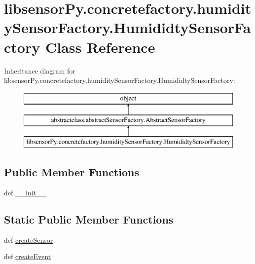 \hypertarget{classlibsensorPy_1_1concretefactory_1_1humiditySensorFactory_1_1HumididtySensorFactory}{}\section{libsensor\+Py.\+concretefactory.\+humidity\+Sensor\+Factory.\+Humididty\+Sensor\+Factory Class Reference}
\label{classlibsensorPy_1_1concretefactory_1_1humiditySensorFactory_1_1HumididtySensorFactory}
Inheritance diagram for libsensor\+Py.\+concretefactory.\+humidity\+Sensor\+Factory.\+Humididty\+Sensor\+Factory\+:\begin{figure}[H]
\begin{center}
\leavevmode
\includegraphics[height=3.000000cm]{classlibsensorPy_1_1concretefactory_1_1humiditySensorFactory_1_1HumididtySensorFactory}
\end{center}
\end{figure}
\subsection*{Public Member Functions}
\begin{DoxyCompactItemize}
\item 
def \hyperlink{classlibsensorPy_1_1concretefactory_1_1humiditySensorFactory_1_1HumididtySensorFactory_ae57b1aa7393268149145eec9984a3ca1}{\+\_\+\+\_\+init\+\_\+\+\_\+}
\end{DoxyCompactItemize}
\subsection*{Static Public Member Functions}
\begin{DoxyCompactItemize}
\item 
def \hyperlink{classlibsensorPy_1_1concretefactory_1_1humiditySensorFactory_1_1HumididtySensorFactory_a74c9d5d974b9d1ddf0825af586bc9e4e}{create\+Sensor}
\item 
def \hyperlink{classlibsensorPy_1_1concretefactory_1_1humiditySensorFactory_1_1HumididtySensorFactory_a9dd587266515bedfff546a402cde5c9f}{create\+Event}
\end{DoxyCompactItemize}


